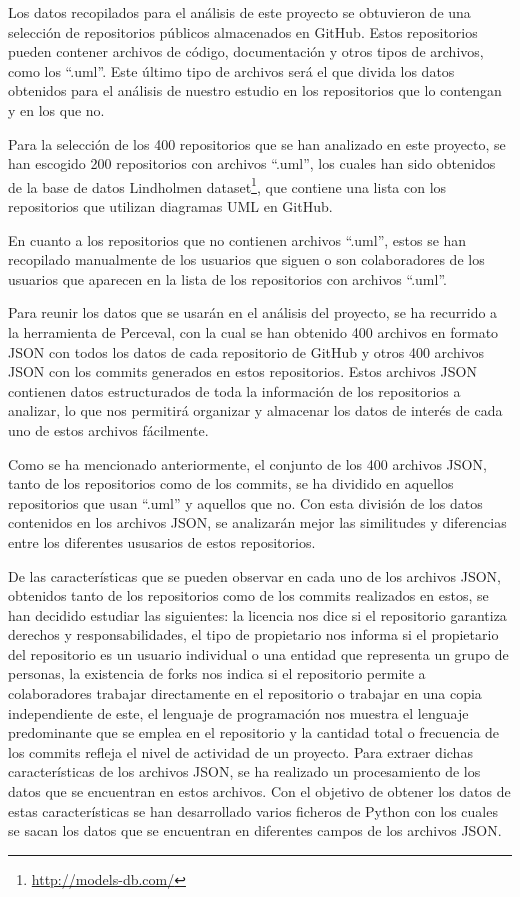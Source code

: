 \documentclass[a4paper, 12pt]{book}
\begin{document}
Los datos recopilados para el análisis de este proyecto se obtuvieron de una selección de repositorios públicos almacenados en GitHub. 
Estos repositorios pueden contener archivos de código, documentación y otros tipos de archivos, como los ``.uml''.
Este último tipo de archivos será el que divida los datos obtenidos para el análisis de nuestro estudio en los repositorios que lo contengan y en los que no.


Para la selección de los 400 repositorios que se han analizado en este proyecto, se han escogido 200 repositorios con archivos ``.uml'', los cuales han sido obtenidos de la base de datos Lindholmen dataset\footnote{\url{http://models-db.com/}}, que contiene una lista con los repositorios que utilizan diagramas UML en GitHub.


En cuanto a los repositorios que no contienen archivos ``.uml'', estos se han recopilado manualmente de los usuarios que siguen o son colaboradores de los usuarios que aparecen en la lista de los repositorios con archivos ``.uml''.


Para reunir los datos que se usarán en el análisis del proyecto, se ha recurrido a la herramienta de Perceval, con la cual se han obtenido 400 archivos en formato JSON con todos los datos de cada repositorio de GitHub y otros 400 archivos JSON con los commits generados en estos repositorios.
Estos archivos JSON contienen datos estructurados de toda la información de los repositorios a analizar, lo que nos permitirá organizar y almacenar los datos de interés de cada uno de estos archivos fácilmente. 


Como se ha mencionado anteriormente, el conjunto de los 400 archivos JSON, tanto de los repositorios como de los commits, se ha dividido en aquellos repositorios que usan ``.uml'' y aquellos que no. 
Con esta división de los datos contenidos en los archivos JSON, se analizarán mejor las similitudes y diferencias entre los diferentes ususarios de estos repositorios. 


De las características que se pueden observar en cada uno de los archivos JSON, obtenidos tanto de los repositorios como de los commits realizados en estos, se han decidido estudiar las siguientes: la licencia nos dice si el repositorio garantiza derechos y responsabilidades,
el tipo de propietario nos informa si el propietario del repositorio es un usuario individual o una entidad que representa un grupo de personas, la existencia de forks nos indica si el repositorio permite a colaboradores trabajar directamente en el repositorio o trabajar en una copia independiente de este,
el lenguaje de programación nos muestra el lenguaje predominante que se emplea en el repositorio y la cantidad total o frecuencia de los commits refleja el nivel de actividad de un proyecto.
Para extraer dichas características de los archivos JSON, se ha realizado un procesamiento de los datos que se encuentran en estos archivos.
Con el objetivo de obtener los datos de estas características se han desarrollado varios ficheros de Python con los cuales se sacan los datos que se encuentran en diferentes campos de los archivos JSON.
\end{document}
